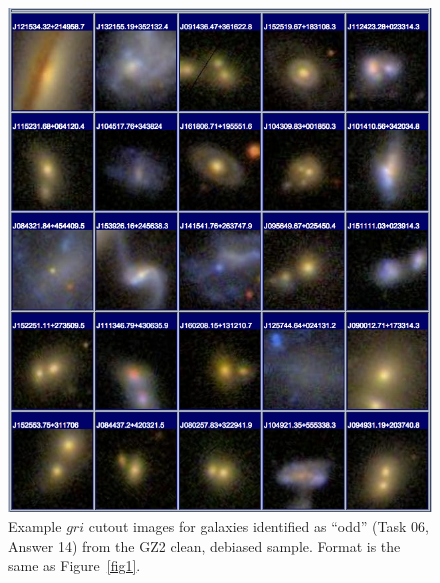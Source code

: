 \documentclass[useAMS,usenatbib]{mn2e}
\begin{document}
\newpage
\clearpage
\begin{figure}
\includegraphics[angle=0,width=7.0in]{figures/gallery/odd.png}
\caption{Example $gri$ cutout images for galaxies identified as ``odd'' (Task 06, Answer 14) from the GZ2 clean, debiased sample. Format is the same as Figure~\ref{fig1}.}
\end{figure}
\end{document}
